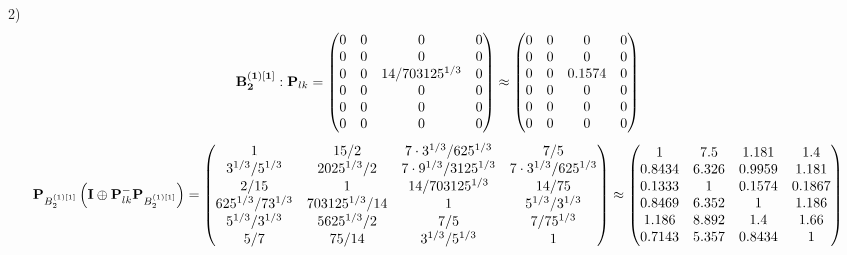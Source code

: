 \documentclass[10pt,a4paper]{article}
\begin{document}
	2)
	\[
		\bold{B_2^{(1)[1]}}: \bold{P}_{lk} = 
		\begin{pmatrix}
			{{0}}{} & {{0}}{} & {{0}}{} & {{0}}{} \\
			{{0}}{} & {{0}}{} & {{0}}{} & {{0}}{} \\
			{{0}}{} & {{0}}{} & {{14}} / {{703125^ {1 / 3}}} & {{0}}{} \\
			{{0}}{} & {{0}}{} & {{0}}{} & {{0}}{} \\
			{{0}}{} & {{0}}{} & {{0}}{} & {{0}}{} \\
			{{0}}{} & {{0}}{} & {{0}}{} & {{0}}{} \\
		\end{pmatrix}
		\approx
		\begin{pmatrix}
			0        & 0        & 0        & 0        \\
			0        & 0        & 0        & 0        \\
			0        & 0        & 0.1574   & 0        \\
			0        & 0        & 0        & 0        \\
			0        & 0        & 0        & 0        \\
			0        & 0        & 0        & 0        \\
		\end{pmatrix}
	\]
	\[
		\bold{P}_{B_2^{(1)[1]}}\left(\bold{I} \oplus \bold{P}_{lk}^{-}\bold{P}_{B_2^{(1)[1]}}\right) = 
		\begin{pmatrix}
			{1}{} & {{15}} / {{2}} & {{7} \cdot {3^ {1 / 3}}} / {{625^ {1 / 3}}} & {{7}} / {{5}} \\
			{{3^ {1 / 3}}} / {{5^ {1 / 3}}} & {{2025^ {1 / 3}}} / {{2}} & {{7} \cdot {9^ {1 / 3}}} / {{3125^ {1 / 3}}} & {{7} \cdot {3^ {1 / 3}}} / {{625^ {1 / 3}}} \\
			{{2}} / {{15}} & {1}{} & {{14}} / {{703125^ {1 / 3}}} & {{14}} / {{75}} \\
			{{625^ {1 / 3}}} / {{7}{3^ {1 / 3}}} & {{703125^ {1 / 3}}} / {{14}} & {1}{} & {{5^ {1 / 3}}} / {{3^ {1 / 3}}} \\
			{{5^ {1 / 3}}} / {{3^ {1 / 3}}} & {{5625^ {1 / 3}}} / {{2}} & {{7}} / {{5}} & {{7}} / {{75^ {1 / 3}}} \\
			{{5}} / {{7}} & {{75}} / {{14}} & {{3^ {1 / 3}}} / {{5^ {1 / 3}}} & {1}{} \\
		\end{pmatrix}
		\approx
		\begin{pmatrix}
			1        & 7.5      & 1.181    & 1.4      \\
			0.8434   & 6.326    & 0.9959   & 1.181    \\
			0.1333   & 1        & 0.1574   & 0.1867   \\
			0.8469   & 6.352    & 1        & 1.186    \\
			1.186    & 8.892    & 1.4      & 1.66     \\
			0.7143   & 5.357    & 0.8434   & 1        \\
		\end{pmatrix}
	\]
\end{document}
